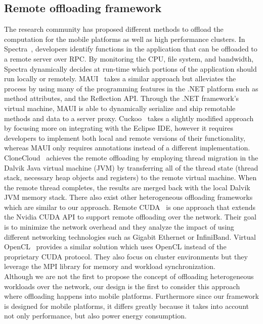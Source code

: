 \documentclass[conference]{IEEEtran}
\begin{document}
\subsection{Remote offloading framework}
The research community has proposed different methods to offload the
computation for the mobile platforms as well as high performance
clusters.
%
In Spectra~\cite{spectra}, developers identify functions in the
application that can be offloaded to a remote server over RPC.
%
By monitoring the CPU, file system, and bandwidth, Spectra dynamically
decides at run-time which portions of the application should run locally
or remotely.
%
MAUI~\cite{maui} takes a similar approach but alleviates the process by
using many of the programming features in the .NET platform such as
method attributes, and the Reflection API.
%
Through the .NET framework's virtual machine, MAUI is able to
dynamically serialize and ship remotable methods and data to a server
proxy.
%
Cuckoo~\cite{cuckoo} takes a slightly modified approach by focusing more on
integrating with the Eclipse IDE, however it requires developers to
implement both local and remote versions of their functionality, whereas
MAUI only requires annotations instead of a different implementation.
%
CloneCloud~\cite{clonecloud} achieves the remote offloading by employing thread
migration in the Dalvik Java virtual machine (JVM) by transferring all
of the thread state (thread stack, necessary heap objects and registers)
to the remote virtual machine.
%
When the remote thread completes, the results are merged back with the
local Dalvik JVM memory stack.
%
There also exist other heterogeneous offloading frameworks which are
similar to our approach.
%
Remote CUDA~\cite{rcuda} is one approach that extends the Nvidia CUDA API
to support remote offloading over the network.
%
Their goal is to minimize the network overhead and they analyze the
impact of using different networking technologies such as Gigabit
Ethernet or InfiniBand.
%
Virtual OpenCL~\cite{vocl} provides a similar solution which uses OpenCL
instead of the proprietary CUDA protocol.
%
They also focus on cluster environments but they leverage the MPI
library for memory and workload synchronization.\\
%
\indent Although we are not the first to propose the concept of offloading
heterogeneous workloads over the network, our design is the first to
consider this approach where offloading happens into mobile platforms.
%
Furthermore since our framework is designed for mobile platforms, it differs greatly
because it takes into account not only performance, but also power energy
consumption. 
%
\end{document}
